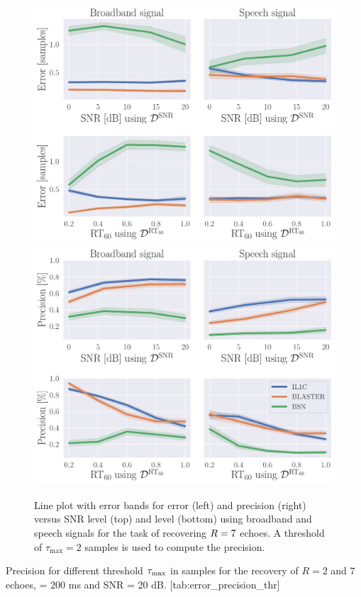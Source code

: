 \begin{figure}[ht]
    \centering
    \begin{fullwidth}
        \includegraphics[width=.49\textwidth]{figures/blaster/e_k-7_thr-2_bns_crocco_blaster.pdf}
        \includegraphics[width=.49\textwidth]{figures/blaster/p_k-7_thr-2_bns_crocco_blaster.pdf}
        \caption{%
            \label{fig:error_precision_snr_rt}
            Line plot with error bands for error (left) and precision (right) versus SNR level (top) and \RT{} level (bottom) using broadband and speech signals for the task of recovering $R=7$ echoes. A threshold of $\tau_{\textrm{max}}=2$ samples is used to compute the precision.
        }

    \end{fullwidth}
\end{figure}

\begin{table}[ht]
    \begin{sidecaption}[]{
        Precision for different threshold $\tau_\text{max}$ in samples for the recovery of $R = 2$ and $7$ echoes, \RT{} = $200$ ms and SNR = 20 dB.
    }[tab:error_precision_thr]
    \centering
    \footnotesize
    
    \end{sidecaption}
\end{table}

